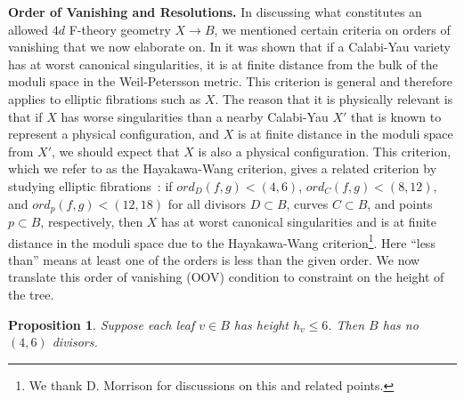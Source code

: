 \documentclass[aps,prl,twocolumn, superscriptaddress,groupedaddress,nofootinbib]{revtex4-1}
\newtheorem{prop}{Proposition}
\newcommand{\XXX}[3]{}
\begin{document}
\vspace{.2cm}
\noindent \textbf{Order of Vanishing and Resolutions.}
In discussing what constitutes an allowed $4d$ F-theory geometry $X\to B$, we mentioned
certain criteria on orders of vanishing that we now elaborate on. In 
\cite{Hayakawa,Wang} it was shown that if a Calabi-Yau variety has at worst
canonical singularities, it is at finite distance 
from the bulk of the moduli space in the Weil-Petersson metric. 
This criterion is general and therefore applies to elliptic fibrations such as $X$.
The reason that it is physically relevant is that if $X$ has worse singularities
than a nearby Calabi-Yau $X'$ that is known to represent a physical configuration,
and $X$ is at finite distance in the moduli space from $X'$, we should expect that
$X$ is also a physical configuration. This criterion, which we refer to as the
Hayakawa-Wang criterion, gives a related criterion by studying elliptic
fibrations~\cite{Grassi1991, Candelas:2000nc, Morrisonunp}:
if $ord_D (f,g) < (4,6)$, $ord_C(f,g) < (8,12)$, and $ord_p(f,g) < (12,18)$ 
for all divisors $D\subset B$, curves $C\subset B$, and points $p\subset B$, respectively,
then  $X$ has at worst
canonical singularities and is at finite distance in the
moduli space due to the Hayakawa-Wang criterion\footnote{We thank D. Morrison for discussions on
this and related points.}. Here ``less than'' means at least one of the orders is less than the given order. %
 We now translate this order of vanishing (OOV) condition to constraint on the height of the tree.%
\begin{prop}
\label{prop:heightcrit}
Suppose each leaf $v\in B$ has height $h_v\leq 6$. Then $B$ has
no $(4,6)$ divisors.
\end{prop}
\end{document}
